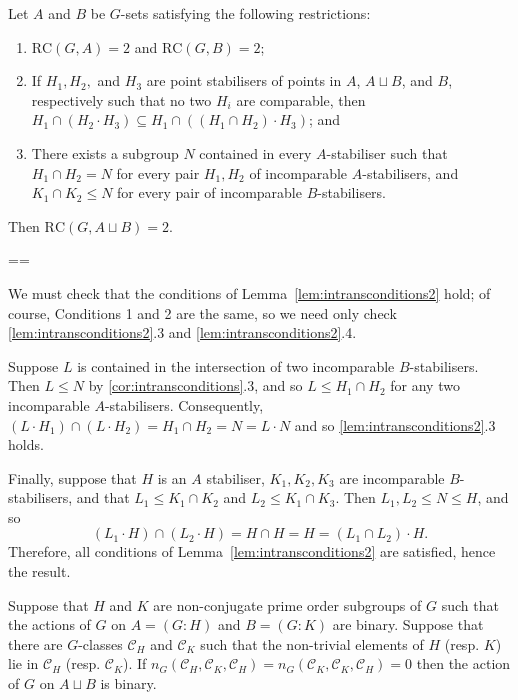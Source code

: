 \documentclass[11pt, a4paper]{amsart}
\makeatletter
\newcommand\C{\mathcal{C}}
\renewcommand{\proofname}{Proof}
\renewenvironment{proof}[1][\proofname]{\par
  \pushQED{\qed}  \normalfont \partopsep=\z@skip \topsep=\z@skip
  \trivlist
  \item[\hskip\labelsep
        \scshape
    #1\@addpunct{.}]\ignorespaces
}{  \popQED\endtrivlist\@endpefalse
}
\makeatother
\begin{document}
\begin{cor}\label{cor:intransconditions}
    Let $A$ and $B$ be $G$-sets satisfying the following restrictions:\begin{enumerate}
        \item[1.] $\mathrm{RC}(G,A)=2$ and $\mathrm{RC}(G,B)=2$;
        \item[2.] If $H_1, H_2,$ and $H_3$ are point stabilisers of points in $A$, $A\sqcup B$, and $B$, respectively such that no two $H_i$ are comparable, then $H_1\cap (H_2\cdot H_3)\subseteq H_1\cap((H_1\cap H_2)\cdot H_3)$; and
        \item[3.] There exists a subgroup $N$ contained in every $A$-stabiliser such that $H_1\cap H_2=N$ for every pair $H_1,H_2$ of incomparable $A$-stabilisers, and $K_1\cap K_2\leq N$ for every pair of incomparable $B$-stabilisers. 
    \end{enumerate}
    Then $\mathrm{RC}(G,A\sqcup B)=2$.
\end{cor}
\begin{proof} 
We must check that the conditions of Lemma~\ref{lem:intransconditions2} hold; of course, Conditions 1 and 2 are the same, so we need only check \ref{lem:intransconditions2}.3 and \ref{lem:intransconditions2}.4.

Suppose $L$ is contained in the intersection of two incomparable $B$-stabilisers. Then $L\leq N$ by \ref{cor:intransconditions}.3, and so $L\leq H_1\cap H_2$ for any two incomparable $A$-stabilisers. Consequently, $(L\cdot H_1)\cap (L\cdot H_2)=H_1\cap H_2=N=L\cdot N$ and so \ref{lem:intransconditions2}.3 holds.

Finally, suppose that $H$ is an $A$ stabiliser, $K_1,K_2,K_3$ are incomparable $B$-stabilisers, and that $L_1\leq K_1\cap K_2$ and $L_2\leq K_1\cap K_3$. Then $L_1,L_2\leq N\leq H$, and so $$(L_1\cdot H)\cap (L_2\cdot H)=H\cap H=H=(L_1\cap L_2)\cdot H.$$ Therefore, all conditions of Lemma~\ref{lem:intransconditions2} are satisfied, hence the result.
           \end{proof}
\begin{cor}\label{cor:intranscharcalc}
    Suppose that $H$ and $K$ are non-conjugate prime order subgroups of $G$ such that the actions of $G$ on $A=(G:H)$ and $B=(G:K)$ are binary. Suppose that there are $G$-classes $\mathcal{C}_H$ and $\mathcal{C}_K$ such that the non-trivial elements of $H$ (resp. $K$) lie in $\mathcal{C}_H$ (resp. $\C_K$). If $n_G(\mathcal{C}_H,\C_K,\C_H)=n_G(\mathcal{C}_K,\C_K,\C_H)=0$ then the action of $G$ on $A\sqcup B$ is binary.
\end{cor}
\end{document}
